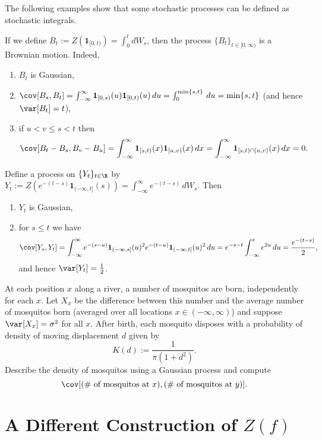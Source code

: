 The following examples show that some stochastic processes can be defined as stochastic integrals.

\begin{exmp} If we define $B_t:=Z(\mathbf{1}_{[0,t)})=\int_0^tdW_s$, then the process $\{B_t\}_{t\in[0,\infty)}$ is a Brownian motion. Indeed,
\begin{enumerate}[label=(\roman*)]
\item $B_t$ is Gaussian,
\item $\cov[B_s,B_t]=\int_{-\infty}^\infty\mathbf{1}_{[0,s)}(u)\mathbf{1}_{[0,t)}(u)\,du=\int_0^{\min\{s,t\}}\,du=\min\{s,t\}$ (and hence $\var[B_t]=t$),
\item if $u<v\leq s<t$ then $$\cov[B_t-B_s,B_v-B_u]=\int_{-\infty}^\infty\mathbf{1}_{[s,t)}(x)\mathbf{1}_{[u,v)}(x)\,dx=\int_{-\infty}^\infty\mathbf{1}_{[s,t)\cap[u,v)}(x)\,dx=0.$$
\end{enumerate}
\end{exmp}

\begin{exmp}[Energy]
Define a process on $\{Y_t\}_{t\in\R}$ by $Y_t:=Z\left(e^{-(t-s)}\mathbf{1}_{(-\infty,t]}(s)\right)=\int_{-\infty}^\infty e^{-(t-s)}\,dW_s.$ Then
\begin{enumerate}[label=(\roman*)]
\item $Y_t$ is Gaussian,
\item for $s\leq t$ we have $$\cov[Y_s,Y_t]=\int_{-\infty}^\infty e^{-(s-u)}\mathbf{1}_{(-\infty,s]}(u)^2e^{-(t-u)}\mathbf{1}_{(-\infty,t]}(u)^2\,du=e^{-s-t}\int_{-\infty}^se^{2u}\,du=\frac{e^{-(t-s)}}{2},$$ and hence $\var[Y_t]=\frac{1}{2}$.
\end{enumerate}
\end{exmp}

\begin{exer}
At each position $x$ along a river, a number of mosquitos are born, independently for each $x$. Let $X_x$ be the difference between this number and the average number of mosquitos born (averaged over all locations $x\in(-\infty,\infty)$) and suppose $\var[X_x]=\sigma^2$ for all $x$. After birth, each mosquito disposes with a probability of density of moving displacement $d$ given by $$K(d):=\frac{1}{\pi(1+d^2)}.$$ Describe the density of mosquitos using a Gaussian process and compute $$\cov[(\#\text{ of mosquitos at }x),(\#\text{ of mosquitos at }y)].$$
\end{exer}


\section{A Different Construction of $Z(f)$}

